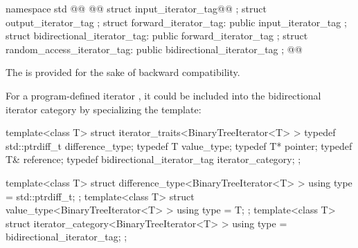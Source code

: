 \begin{codeblock}
namespace std { @@
  @@
  struct input_iterator_tag@@ { };
  struct output_iterator_tag { };
  struct forward_iterator_tag: public input_iterator_tag { };
  struct bidirectional_iterator_tag: public forward_iterator_tag { };
  struct random_access_iterator_tag: public bidirectional_iterator_tag { };
}@\newtxt{\}\}}@
\end{codeblock}

\begin{addedblock}
\pnum
\enternote
The  is provided for the sake of backward compatibility.
\exitnote
\end{addedblock}

\pnum
{}%
%
%
%
%
%
%
\enterexample
For a program-defined iterator
,
it could be included
into the bidirectional iterator category by specializing the
\added{, }
 template:

\begin{removedblock}
\begin{codeblock}
template<class T> struct iterator_traits<BinaryTreeIterator<T> > {
  typedef std::ptrdiff_t difference_type;
  typedef T value_type;
  typedef T* pointer;
  typedef T& reference;
  typedef bidirectional_iterator_tag iterator_category;
};
\end{codeblock}
\end{removedblock}
\begin{addedblock}
\begin{codeblock}
template<class T> struct difference_type<BinaryTreeIterator<T> > {
  using type = std::ptrdiff_t;
};
template<class T> struct value_type<BinaryTreeIterator<T> > {
  using type = T;
};
template<class T> struct iterator_category<BinaryTreeIterator<T> > {
  using type = bidirectional_iterator_tag;
};
\end{codeblock}
\end{addedblock}


